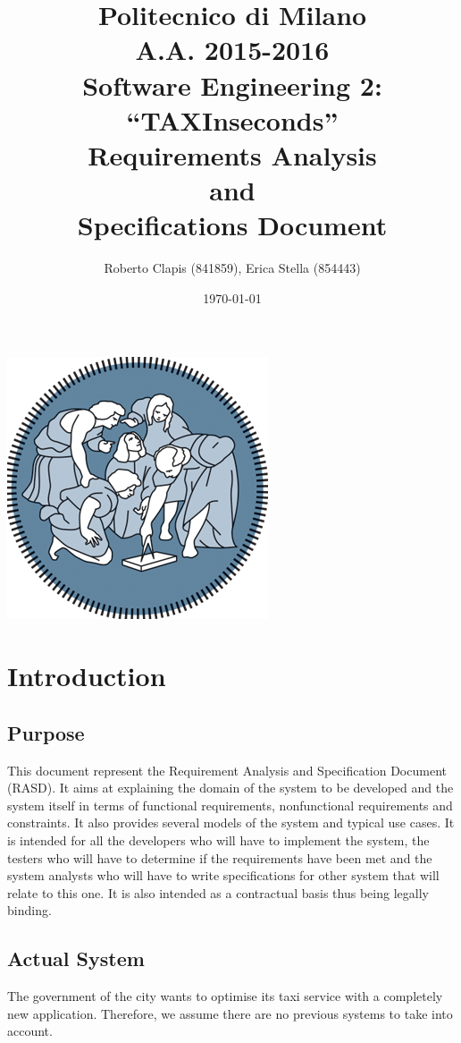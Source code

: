 \documentclass{article}
\author{Roberto Clapis (841859), Erica Stella (854443)}
\date{\today}
\title{Politecnico di Milano
	\\A.A. 2015\@-\@2016
	\\Software Engineering 2: ``TAXInseconds''
	\\\textbf{R}equirements \textbf{A}nalysis \\and\\ \textbf{S}pecifications \textbf{D}ocument}
\begin{document}
\maketitle
\includegraphics{polimi-logo}
\clearpage
\tableofcontents
\clearpage

\section{Introduction}

\subsection{Purpose}
This document represent the Requirement Analysis and Specification Document (RASD). It aims at explaining the domain of the system to be developed and the system itself in terms of functional requirements, nonfunctional requirements and constraints. It also provides several models of the system and typical use cases. It is intended for all the developers who will have to implement the system, the testers who will have to determine if the requirements have been met and the system analysts who will have to write specifications for other system that will relate to this one. It is also intended as a contractual basis thus being legally binding.

\subsection{Actual System}
The government of the city wants to optimise its taxi service with a completely new application. Therefore, we assume there are no previous systems to take into account.
\end{document}
